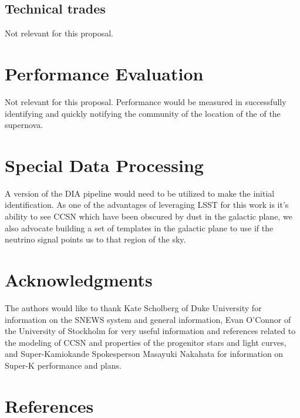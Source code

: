 \documentclass[12pt, letterpaper]{article}
\begin{document}
\subsection{Technical trades}

Not relevant for this proposal.

\section{Performance Evaluation}

Not relevant for this proposal.  Performance would be measured in successfully
identifying and quickly notifying the community of the location of the
of the supernova.

\section{Special Data Processing}

A version of the DIA pipeline would need to be utilized to make the
initial identification.  As one of the advantages of leveraging LSST
for this work is it's ability to see CCSN which have been obscured by
dust in the galactic plane, we also advocate building a set of
templates in the galactic plane to use if the neutrino signal points
us to that region of the sky.

\section{Acknowledgments}

The authors would like to thank Kate Scholberg of Duke University for
information on the SNEWS system and general information, Evan O'Connor
of the University of Stockholm for very useful information and
references related to the modeling of CCSN and properties of the
progenitor stars and light curves, and Super-Kamiokande Spokesperson
Masayuki Nakahata for information on Super-K performance and plans.

\section{References}

 

\end{document}

